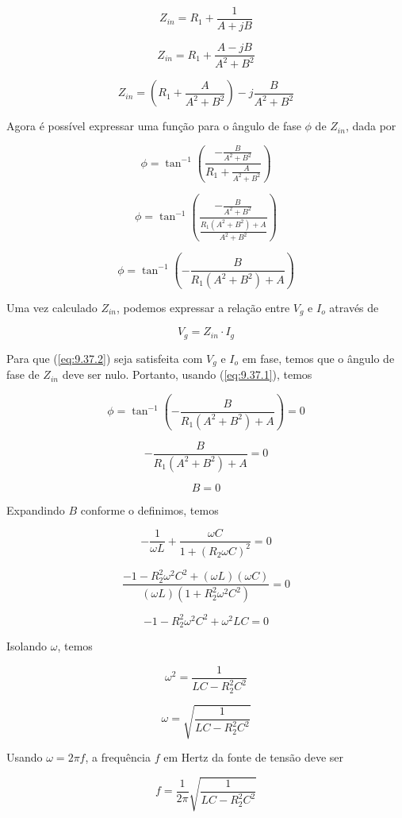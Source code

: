 \[ Z_{in} = R_1 + \frac{1}{A + jB}  \]

\[ Z_{in} = R_1 + \frac{A - jB}{A^2 + B^2}  \]

\[ Z_{in} = \left(R_1 + \frac{A}{A^2 + B^2}\right) - j\frac{B}{A^2 + B^2}  \]

Agora é possível expressar uma função para o ângulo de fase \( \phi \) de \( Z_{in} \), dada por

\[ \phi = \tan^{-1}\left(\frac{-\frac{B}{A^2 + B^2}}{R_1 + \frac{A}{A^2 + B^2}}\right) \]

\[ \phi = \tan^{-1}\left(\frac{-\frac{B}{A^2 + B^2}}{\frac{R_1(A^2 + B^2) + A}{A^2 + B^2}}\right) \]

\begin{equation}\label{eq:9.37.1}
    \phi = \tan^{-1}\left(-\frac{B}{R_1(A^2 + B^2) + A}\right)
\end{equation}

Uma vez calculado $Z_{in}$, podemos expressar a relação entre $V_g$ e $I_o$ através de

\begin{equation}\label{eq:9.37.2}
    V_g = Z_{in} \cdot I_g
\end{equation}

Para que (\ref{eq:9.37.2}) seja satisfeita com $V_g$ e $I_o$ em fase, temos que o ângulo de fase de $Z_{in}$ deve ser nulo. Portanto, usando (\ref{eq:9.37.1}), temos

\[ \phi = \tan^{-1}\left(-\frac{B}{R_1(A^2 + B^2) + A}\right) = 0 \]

\[ -\frac{B}{R_1(A^2 + B^2) + A} = 0 \]

\[ B = 0 \]

Expandindo $B$ conforme o definimos, temos

\[ - \frac{1}{\omega L} + \frac{\omega C}{1 + (R_2\omega C)^2} = 0 \]

\[ \frac{-1 - R_2^2\omega^2 C^2 + (\omega L)(\omega C)}{(\omega L)(1 + R_2^2\omega^2 C^2)} = 0 \]

\[ -1 - R_2^2\omega^2 C^2 + \omega^2LC = 0 \]

Isolando $\omega$, temos

\[ \omega^2 = \frac{1}{LC - R_2^2C^2} \]

\[ \omega = \sqrt{\frac{1}{LC - R_2^2C^2}} \]

Usando $\omega = 2\pi f$, a frequência $f$ em Hertz da fonte de tensão deve ser

\begin{equation}\label{eq:9.37.3}
    f = \frac{1}{2\pi} \sqrt{\frac{1}{LC - R_2^2C^2}}
\end{equation}

